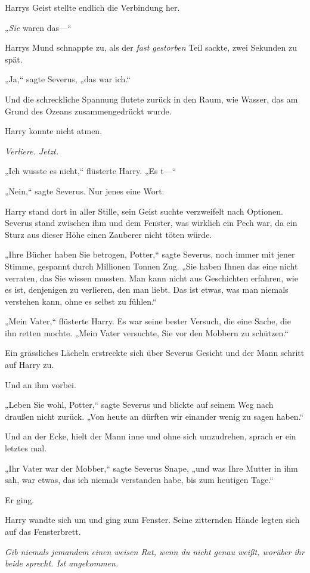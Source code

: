 {Harrys Geist stellte endlich die Verbindung her.

„\emph{Sie} waren das—“

Harrys Mund schnappte zu, als der \emph{fast gestorben} Teil sackte, zwei Sekunden zu spät.

„Ja,“ sagte Severus, „das war ich.“

Und die schreckliche Spannung flutete zurück in den Raum, wie Wasser, das am Grund des Ozeans zusammengedrückt wurde.

Harry konnte nicht atmen.

\emph{Verliere. Jetzt.}

„Ich wusste es nicht,“ flüsterte Harry. „Es t—“

„Nein,“ sagte Severus. Nur jenes eine Wort.

Harry stand dort in aller Stille, sein Geist suchte verzweifelt nach Optionen. Severus stand zwischen ihm und dem Fenster, was wirklich ein Pech war, da ein Sturz aus dieser Höhe einen Zauberer nicht töten würde.

„Ihre Bücher haben Sie betrogen, Potter,“ sagte Severus, noch immer mit jener Stimme, gespannt durch Millionen Tonnen Zug. „Sie haben Ihnen das eine nicht verraten, das Sie wissen mussten. Man kann nicht aus Geschichten erfahren, wie es ist, denjenigen zu verlieren, den man liebt. Das ist etwas, was man niemals verstehen kann, ohne es selbst zu fühlen.“

„Mein Vater,“ flüsterte Harry. Es war seine bester Versuch, die eine Sache, die ihn retten mochte. „Mein Vater versuchte, Sie vor den Mobbern zu schützen.“

Ein grässliches Lächeln erstreckte sich über Severus Gesicht und der Mann schritt auf Harry zu.

Und an ihm vorbei.

„Leben Sie wohl, Potter,“ sagte Severus und blickte auf seinem Weg nach draußen nicht zurück. „Von heute an dürften wir einander wenig zu sagen haben.“

Und an der Ecke, hielt der Mann inne und ohne sich umzudrehen, sprach er ein letztes mal.

„Ihr Vater war der Mobber,“ sagte Severus Snape, „und was Ihre Mutter in ihm sah, war etwas, das ich niemals verstanden habe, bis zum heutigen Tage.“

Er ging.

Harry wandte sich um und ging zum Fenster. Seine zitternden Hände legten sich auf das Fensterbrett.

\emph{Gib niemals jemandem einen weisen Rat, wenn du nicht genau weißt, worüber ihr beide sprecht. Ist angekommen.}

}
